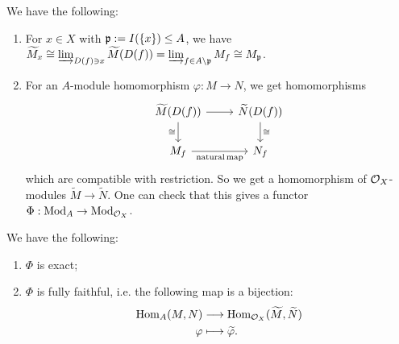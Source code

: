 \begin{remark}
  We have the following:
  \begin{enumerate}
    \item For $x \in X$ with
      $\mathfrak{p} := I(\{x\}) \le A$, we have
      $\widetilde{M}_x \cong \varinjlim_{D(f) \ni x} \widetilde{M}(D(f)) = \varinjlim_{f \in A \setminus \mathfrak{p}} M_f \cong M_{\mathfrak{p}}$.
    \item For an $A$-module
      homomorphism $\varphi : M \to N$,
      we get homomorphisms
      \[
        \begin{tikzcd}
          \widetilde{M}(D(f)) \ar[r]
          \ar[d, "\cong", swap]
          & \widetilde{N}(D(f)) \ar[d, "\cong"] \\
          M_f \ar[r, "\mathrm{natural\, map}", swap]
          & N_f
        \end{tikzcd}
      \]
      which are
      compatible with restriction.
      So we get a homomorphism
      of $\mathcal{O}_X$-modules
      $\widetilde{M} \to \widetilde{N}$.
      One can check that this gives a
      functor
      $\Phi : \mathrm{Mod}_A \to \mathrm{Mod}_{\mathcal{O}_X}$.
  \end{enumerate}
\end{remark}

\begin{prop}\label{prop:properties-of-tilde-functor}
  We have the following:
  \begin{enumerate}
    \item $\Phi$ is exact;
    \item $\Phi$ is fully
      faithful, i.e. the following map
      is a bijection:
      \begin{align*}
        \operatorname{Hom}_A(M, N)
        &\longrightarrow
        \operatorname{Hom}_{\mathcal{O}_X}(\widetilde{M}, \widetilde{N}) \\
        \varphi &\longmapsto \widetilde{\varphi}.
      \end{align*}
  \end{enumerate}
\end{prop}

